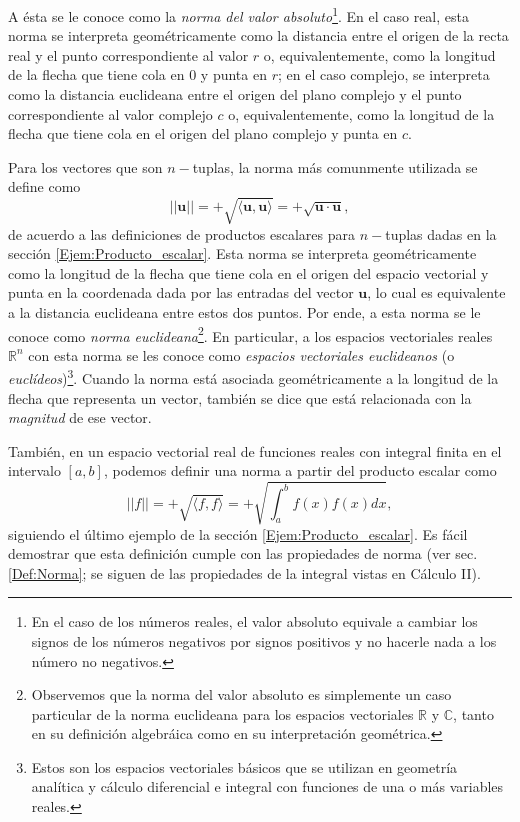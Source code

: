 \documentclass[12pt,dvipsnames]{article}
\begin{document}
\noindent A ésta se le conoce como la \emph{norma del valor absoluto}\footnote{En el caso de los números reales, el valor absoluto equivale a cambiar los signos de los números negativos por signos positivos y no hacerle nada a los número no negativos.}. En el caso real, esta norma se interpreta geométricamente como la distancia entre el origen de la recta real y el punto correspondiente al valor $r$ o, equivalentemente, como la longitud de la flecha que tiene cola en $0$ y punta en $r$; en el caso complejo, se interpreta como la distancia euclideana entre el origen del plano complejo y el punto correspondiente al valor complejo $c$ o, equivalentemente, como la longitud de la flecha que tiene cola en el origen del plano complejo y punta en $c$. 

\vspace{3mm}

Para los vectores que son $n-$tuplas, la norma más comunmente utilizada se define como $$||\mathbf{u}|| = +\sqrt{\langle\mathbf{u},\mathbf{u}\rangle} = +\sqrt{\mathbf{u}\cdot\mathbf{u}},$$ \noindent de acuerdo a las definiciones de productos escalares para $n-$tuplas dadas en la sección \ref{Ejem:Producto_escalar}. Esta norma se interpreta geométricamente como la longitud de la flecha que tiene cola en el origen del espacio vectorial y punta en la coordenada dada por las entradas del vector $\mathbf{u}$, lo cual es equivalente a la distancia euclideana entre estos dos puntos. Por ende, a esta norma se le conoce como \emph{norma euclideana}\footnote{Observemos que la norma del valor absoluto es simplemente un caso particular de la norma euclideana para los espacios vectoriales $\mathbb{R}$ y $\mathbb{C}$, tanto en su definición algebráica como en su interpretación geométrica.}. En particular, a los espacios vectoriales reales $\mathbb{R}^n$ con esta norma se les conoce como \emph{espacios vectoriales euclideanos} (o \emph{euclídeos})\footnote{Estos son los espacios vectoriales básicos que se utilizan en geometría analítica y cálculo diferencial e integral con funciones de una o más variables reales.}. Cuando la norma está asociada geométricamente a la longitud de la flecha que representa un vector, también se dice que está relacionada con la \emph{magnitud} de ese vector.

\vspace{3mm}

También, en un espacio vectorial real de funciones reales con integral finita en el intervalo $[a,b]$, podemos definir una norma a partir del producto escalar como $$||f|| = +\sqrt{\langle f,f\rangle} = +\sqrt{\int_a^b f(x)f(x) dx},$$ \noindent siguiendo el último ejemplo de la sección \ref{Ejem:Producto_escalar}. Es fácil demostrar que esta definición cumple con las propiedades de norma (ver sec. \ref{Def:Norma}; se siguen de las propiedades de la integral vistas en Cálculo II). 
\end{document}
